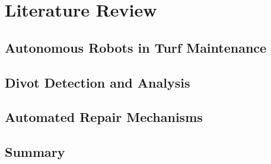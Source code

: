 \chapter{Literature Review}
\label{chap:lit_review}

\section{Autonomous Robots in Turf Maintenance}

\section{Divot Detection and Analysis}

\section{Automated Repair Mechanisms}

\section{Summary}
